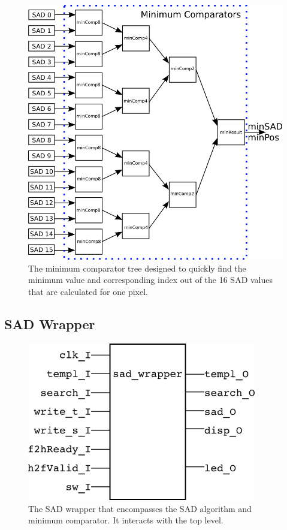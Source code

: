 \begin{figure}[h]
	\begin{center}
		\includegraphics[width=150mm]{figures/minComparator.png}
		\captionfonts
		\caption{The minimum comparator tree designed to quickly find the minimum value and corresponding index out of the 16 SAD values that are calculated for one pixel.}
		\label{fig:minComp}
	\end{center}
\end{figure}


\subsection{SAD Wrapper}

\begin{figure}[h]
	\begin{center}
		\includegraphics[width=100mm]{figures/sad_wrapper_rtl.png}
		\captionfonts
		\caption{The SAD wrapper that encompasses the SAD algorithm and minimum comparator. It interacts with the top level.}
		\label{fig:sadWrapper_rtl}
	\end{center}
\end{figure}


